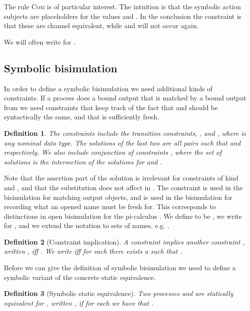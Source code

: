 \documentclass{eptcs}
\newtheorem{definition}{Definition}
\theoremstyle{definition}
\begin{document}
The rule \textsc{Com} is of particular interest. The intuition is that the
symbolic action subjects are placeholders for the values  and .
In the conclusion the constraint is that these are channel
equivalent, while  and  will not occur again.

We will often write  for .

\subsection{Symbolic bisimulation}

In order to define a symbolic bisimulation we need additional kinds of
constraints. If a process  does a bound output
 that is matched by a bound output 
from  we need constraints that keep track of the fact that  and 
should be syntactically the same, and that  is sufficiently fresh.
\begin{definition}
The {\em constraints} include the transition constraints, 
 , and
, where  is any nominal data type. The solutions of
the last two are all pairs  such that 
and  respectively. We also include conjunction of
constraints , where the set of solutions is the
intersection of the
solutions for  and .
\end{definition}
Note that the assertion part of the solution is irrelevant for constraints of kind  and
, and that the substitution does not affect  in .
The constraint  is
used in the bisimulation for matching output objects, and  is
used in the bisimulation for recording what an opened name must be fresh for.
This corresponds to distinctions in open bisimulation for the pi-calculus
\cite{sangiorgi:theory-bisimulation}.
We define  to be , we write  for
, and we extend the notation to sets of names, e.g.
.


\begin{definition}[Constraint implication]
 A constraint  \emph{implies} another constraint , written , iff .
We write  iff
 for
each  there exists a  such that .
\end{definition}

Before we can give the definition of symbolic
bisimulation we need to define a symbolic variant of  the concrete static equivalence.

\begin{definition}[Symbolic static equivalence]
 \label{def:ssequivalent}
 Two processes  and  are \emph{statically equivalent} for , written
, if for each 
we have that .
\end{definition}
\end{document}
